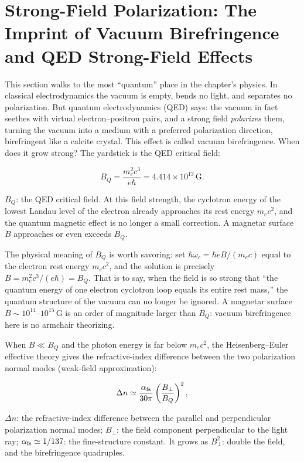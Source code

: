 \section{Strong-Field Polarization: The Imprint of Vacuum Birefringence and QED Strong-Field Effects}
\label{sec:e18-qed}

This section walks to the most ``quantum'' place in the chapter's physics. In classical electrodynamics the vacuum is empty, bends no light, and separates no polarization. But quantum electrodynamics (QED) says: the vacuum in fact seethes with virtual electron--positron pairs, and a strong field \emph{polarizes} them, turning the vacuum into a medium with a preferred polarization direction, birefringent like a calcite crystal. This effect is called vacuum birefringence. When does it grow strong? The yardstick is the QED critical field:

\begin{equation}
  B_Q=\frac{m_e^2c^3}{e\hbar}=4.414\times10^{13}\,\mathrm{G}.
  \label{eq:e18-bq}
\end{equation}
\begin{formulaexplain}
\(B_Q\): the QED critical field. At this field strength, the cyclotron energy of the lowest Landau level of the electron already approaches its rest energy \(m_ec^2\), and the quantum magnetic effect is no longer a small correction. A magnetar surface \(B\) approaches or even exceeds \(B_Q\).
\end{formulaexplain}

The physical meaning of \(B_Q\) is worth savoring: set \(\hbar\omega_c=\hbar eB/(m_ec)\) equal to the electron rest energy \(m_ec^2\), and the solution is precisely \(B=m_e^2c^3/(e\hbar)=B_Q\). That is to say, when the field is so strong that ``the quantum energy of one electron cyclotron loop equals its entire rest mass,'' the quantum structure of the vacuum can no longer be ignored. A magnetar surface \(B\sim10^{14}\)--\(10^{15}\,\mathrm{G}\) is an order of magnitude larger than \(B_Q\): vacuum birefringence here is no armchair theorizing.

When \(B\ll B_Q\) and the photon energy is far below \(m_ec^2\), the Heisenberg--Euler effective theory gives the refractive-index difference between the two polarization normal modes (weak-field approximation):

\begin{equation}
  \Delta n\simeq\frac{\alpha_{\rm fs}}{30\pi}
  \left(\frac{B_\perp}{B_Q}\right)^2 ,
  \label{eq:e18-dn}
\end{equation}
\begin{formulaexplain}
\(\Delta n\): the refractive-index difference between the parallel and perpendicular polarization normal modes; \(B_\perp\): the field component perpendicular to the light ray; \(\alpha_{\rm fs}\simeq1/137\): the fine-structure constant. It grows as \(B_\perp^2\): double the field, and the birefringence quadruples.
\end{formulaexplain}

